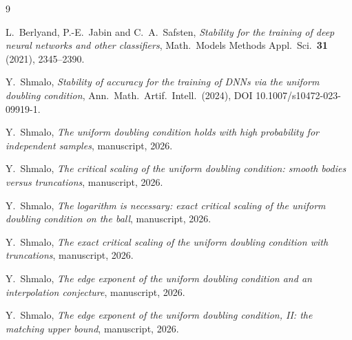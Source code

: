 ﻿\documentclass[11pt]{article}
\begin{document}
\begin{thebibliography}{9}

L.~Berlyand, P.-E.~Jabin and C.~A.~Safsten,
\emph{Stability for the training of deep neural networks and other
classifiers}, Math.\ Models Methods Appl.\ Sci.\ \textbf{31} (2021),
2345--2390.

Y.~Shmalo,
\emph{Stability of accuracy for the training of DNNs via the uniform doubling
condition}, Ann.\ Math.\ Artif.\ Intell.\ (2024),
DOI 10.1007/s10472-023-09919-1.

Y.~Shmalo, \emph{The uniform doubling condition holds with high probability
for independent samples}, manuscript, 2026.

Y.~Shmalo, \emph{The critical scaling of the uniform doubling condition:
smooth bodies versus truncations}, manuscript, 2026.

Y.~Shmalo, \emph{The logarithm is necessary: exact critical scaling of the
uniform doubling condition on the ball}, manuscript, 2026.

Y.~Shmalo, \emph{The exact critical scaling of the uniform doubling
condition with truncations}, manuscript, 2026.

Y.~Shmalo, \emph{The edge exponent of the uniform doubling condition and an
interpolation conjecture}, manuscript, 2026.

Y.~Shmalo, \emph{The edge exponent of the uniform doubling condition, II:
the matching upper bound}, manuscript, 2026.

\end{thebibliography}
\end{document}
